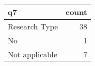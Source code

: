 \begin{tabular}{lr}
\toprule
             q7 &  count \\
\midrule
  Research Type &     38 \\
             No &      1 \\
 Not applicable &      7 \\
\bottomrule
\end{tabular}

